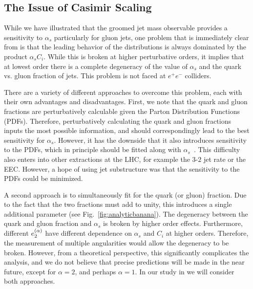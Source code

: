 \subsection{The Issue of Casimir Scaling}
\label{sec:casimir}



While we have illustrated that the groomed jet mass observable provides a sensitivity to $\alpha_s$ particularly for gluon jets, one problem that is immediately clear from  is that the leading behavior of the distributions is always dominated by the product $\alpha_s C_i$. While this is broken at higher perturbative orders, it implies that at lowest order there is a complete degeneracy of the value of $\alpha_s$ and the quark vs. gluon fraction of jets. This problem is not faced at $e^+e^-$ colliders.

There are a variety of different approaches to overcome this problem, each with their own advantages and disadvantages. First, we note that the quark and gluon fractions are perturbatively calculable given the Parton Distribution Functions (PDFs). Therefore, perturbatively calculating the quark and gluon fractions inputs the most possible information, and should correspondingly lead to the best sensitivity for $\alpha_s$. However, it has the downside that it also introduces sensitivity to the PDFs, which in principle should be fitted along with $\alpha_s$~\cite{Accardi:2016ndt}. This difficulty also enters into other extractions at the LHC, for example the $3$-$2$ jet rate or the EEC. However, a hope of using jet substructure was that the sensitivity to the PDFs could be minimized.

A second approach is to simultaneously fit for the quark (or gluon) fraction. Due to the fact that the two fractions must add to unity, this introduces a single additional parameter (see Fig.~\ref{fig:analyticbanana}). The degeneracy between the quark and gluon fraction and $\alpha_s$ is broken by higher order effects. Furthermore, different $e_{2}^{(\alpha)}$ have different dependence on $\alpha_s$ and $C_i$ at higher orders. Therefore, the measurement of multiple angularities would allow the degeneracy to be broken. However, from a theoretical perspective, this significantly complicates the analysis, and we do not believe that precise predictions will be made in the near future, except for $\alpha=2$, and perhaps $\alpha=1$. In our study in  we will consider both approaches.

